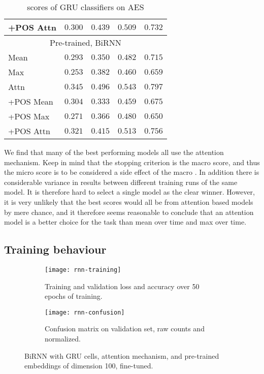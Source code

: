 \begin{table}
\begin{tabular}{lrrrr}
    +POS Attn & $0.300$ & $0.439$ & $0.509$ & $0.732$ \\
    \midrule \multicolumn{5}{c}{Pre-trained, BiRNN} \\ \midrule
    Mean & $0.293$ & $0.350$ & $0.482$ & $0.715$ \\
    Max & $0.253$ & $0.382$ & $0.460$ & $0.659$ \\
    Attn & $0.345$ & $\mathbf{0.496}$ & $0.543$ & $\mathbf{0.797}$ \\
    +POS Mean & $0.304$ & $0.333$ & $0.459$ & $0.675$ \\
    +POS Max & $0.271$ & $0.366$ & $0.480$ & $0.650$ \\
    +POS Attn & $0.321$ & $0.415$ & $0.513$ & $0.756$ \\
    \bottomrule
  \end{tabular}
  \caption{\FI scores of GRU classifiers on AES}
  \label{tab:gru-results}
\end{table}

We find that many of the best performing models all use the attention
mechanism. Keep in mind that the stopping criterion is the macro \FI score,
and thus the micro \FI score is to be considered a side effect of the macro
\FI. In addition there is considerable variance in results between different
training runs of the same model. It is therefore hard to select a single
model as the clear winner. However, it is very unlikely that the best scores
would all be from attention based models by mere chance, and it therefore
seems reasonable to conclude that an attention model is a better choice for
the task than mean over time and max over time.


\subsection{Training behaviour}

\begin{figure}
  \begin{subfigure}{\linewidth}
    \centering
    \texttt{[image: rnn-training]}
    \caption{Training and validation loss and accuracy over 50 epochs of training.}
  \end{subfigure}
  \begin{subfigure}{\linewidth}
    \centering
    \texttt{[image: rnn-confusion]}
    \caption{Confusion matrix on validation set, raw counts and normalized.}
  \end{subfigure}
  \caption{BiRNN with GRU cells, attention mechanism, and pre-trained
           embeddings of dimension 100, fine-tuned.}
  \label{fig:rnn-training}
\end{figure}

